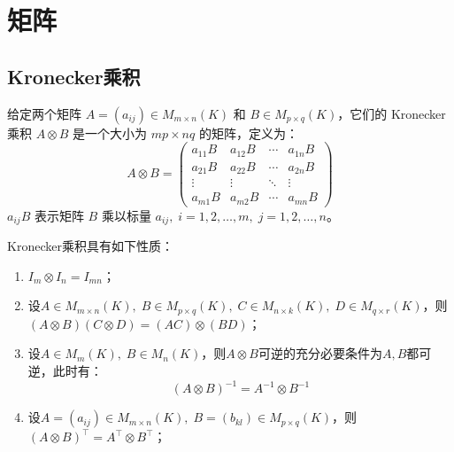 \section{矩阵}

\subsection{Kronecker乘积}
\begin{definition}
	给定两个矩阵 \( A=(a_{ij}) \in M_{m\times n}(K) \) 和 \( B \in M_{p\times q}(K) \)，它们的 Kronecker 乘积 \( A \otimes B \) 是一个大小为 \( mp \times nq \) 的矩阵，定义为：
	\[
	A \otimes B = \begin{pmatrix}
		a_{11} B & a_{12} B & \cdots & a_{1n} B \\
		a_{21} B & a_{22} B & \cdots & a_{2n} B \\
		\vdots & \vdots & \ddots & \vdots \\
		a_{m1} B & a_{m2} B & \cdots & a_{mn} B
	\end{pmatrix}
	\]
	\( a_{ij} B \) 表示矩阵 \( B \) 乘以标量 \( a_{ij},\;i=1,2,\dots,m,\;j=1,2,\dots,n \)。
\end{definition}
\begin{property}\label{prop:Kronecker}
	Kronecker乘积具有如下性质：
	\begin{enumerate}
		\item $I_m\otimes I_n=I_{mn}$；
		\item 设$A\in M_{m\times n}(K),\;B\in M_{p\times q}(K),\;C\in M_{n\times k}(K),\;D\in M_{q\times r}(K)$，则$(A\otimes B)(C\otimes D)=(AC)\otimes (BD)$；
		\item 设$A\in M_{m}(K),\;B\in M_{n}(K)$，则$A\otimes B$可逆的充分必要条件为$A,B$都可逆，此时有：
		\begin{equation*}
			(A\otimes B)^{-1}=A^{-1}\otimes B^{-1}
		\end{equation*}
		\item 设$A=(a_{ij})\in M_{m\times n}(K),\;B=(b_{kl})\in M_{p\times q}(K)$，则$(A\otimes B)^{\top}=A^{\top}\otimes B^{\top}$；
	\end{enumerate}
\end{property}
